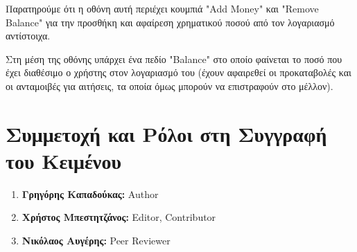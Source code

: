 \documentclass[12pt,a4paper]{article}
\begin{document}
Παρατηρούμε ότι η οθόνη αυτή περιέχει κουμπιά "Add Money" και "Remove Balance" για την προσθήκη και αφαίρεση χρηματικού ποσού από τον λογαριασμό αντίστοιχα.

Στη μέση της οθόνης υπάρχει ένα πεδίο "Balance" στο οποίο φαίνεται το ποσό που έχει διαθέσιμο ο χρήστης στον λογαριασμό του (έχουν αφαιρεθεί οι προκαταβολές και οι ανταμοιβές για αιτήσεις, τα οποία όμως μπορούν να επιστραφούν στο μέλλον).

\section{Συμμετοχή και Ρόλοι στη Συγγραφή του Κειμένου}

\begin{enumerate}
	\item \textbf{Γρηγόρης Καπαδούκας:} Author
	\item \textbf{Χρήστος Μπεστητζάνος:} Editor, Contributor
	\item \textbf{Νικόλαος Αυγέρης:} Peer Reviewer
\end{enumerate}
\end{document}
